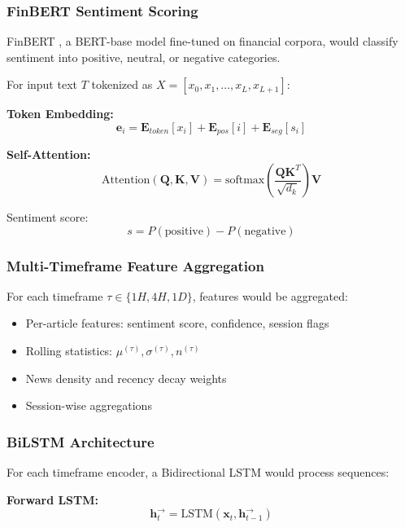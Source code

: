 \documentclass[conference]{IEEEtran}
\begin{document}
\subsubsection{FinBERT Sentiment Scoring}
FinBERT \cite{araci2019}, a BERT-base model fine-tuned on financial corpora, would classify sentiment into positive, neutral, or negative categories.

For input text $T$ tokenized as $X = [x_0, x_1, \ldots, x_L, x_{L+1}]$:

\textbf{Token Embedding:}
\begin{equation}
\mathbf{e}_i = \mathbf{E}_{token}[x_i] + \mathbf{E}_{pos}[i] + \mathbf{E}_{seg}[s_i]
\end{equation}

\textbf{Self-Attention:}
\begin{equation}
\text{Attention}(\mathbf{Q}, \mathbf{K}, \mathbf{V}) = \text{softmax}\left(\frac{\mathbf{Q}\mathbf{K}^T}{\sqrt{d_k}}\right)\mathbf{V}
\end{equation}

Sentiment score:
\begin{equation}
s = P(\text{positive}) - P(\text{negative})
\end{equation}

\subsubsection{Multi-Timeframe Feature Aggregation}
For each timeframe $\tau \in \{1H, 4H, 1D\}$, features would be aggregated:
\begin{itemize}
\item Per-article features: sentiment score, confidence, session flags
\item Rolling statistics: $\mu^{(\tau)}, \sigma^{(\tau)}, n^{(\tau)}$
\item News density and recency decay weights
\item Session-wise aggregations
\end{itemize}

\subsubsection{BiLSTM Architecture}
For each timeframe encoder, a Bidirectional LSTM would process sequences:

\textbf{Forward LSTM:}
\begin{equation}
\mathbf{h}_t^{\rightarrow} = \text{LSTM}(\mathbf{x}_t, \mathbf{h}_{t-1}^{\rightarrow})
\end{equation}
\end{document}
